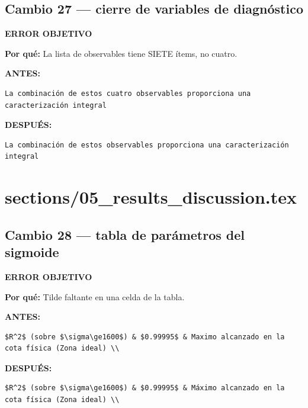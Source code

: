 \documentclass[11pt,a4paper]{article}
\begin{document}
\subsection*{Cambio 27 --- cierre de variables de diagnóstico}
\colorbox{okbg}{\textbf{\footnotesize ERROR OBJETIVO}}

\textbf{Por qué:} La lista de observables tiene SIETE ítems, no cuatro.

\textcolor{antesline}{\textbf{ANTES:}}
\begin{Verbatim}[breaklines=true, breakanywhere=true, fontsize=\small, frame=leftline, rulecolor=\color{antesline}, framerule=1.2pt]
La combinación de estos cuatro observables proporciona una caracterización integral
\end{Verbatim}
\textcolor{despline}{\textbf{DESPUÉS:}}
\begin{Verbatim}[breaklines=true, breakanywhere=true, fontsize=\small, frame=leftline, rulecolor=\color{despline}, framerule=1.2pt]
La combinación de estos observables proporciona una caracterización integral
\end{Verbatim}


\section*{sections/05\_results\_discussion.tex}
\subsection*{Cambio 28 --- tabla de parámetros del sigmoide}
\colorbox{okbg}{\textbf{\footnotesize ERROR OBJETIVO}}

\textbf{Por qué:} Tilde faltante en una celda de la tabla.

\textcolor{antesline}{\textbf{ANTES:}}
\begin{Verbatim}[breaklines=true, breakanywhere=true, fontsize=\small, frame=leftline, rulecolor=\color{antesline}, framerule=1.2pt]
$R^2$ (sobre $\sigma\ge1600$) & $0.99995$ & Maximo alcanzado en la cota física (Zona ideal) \\
\end{Verbatim}
\textcolor{despline}{\textbf{DESPUÉS:}}
\begin{Verbatim}[breaklines=true, breakanywhere=true, fontsize=\small, frame=leftline, rulecolor=\color{despline}, framerule=1.2pt]
$R^2$ (sobre $\sigma\ge1600$) & $0.99995$ & Máximo alcanzado en la cota física (Zona ideal) \\
\end{Verbatim}
\end{document}
